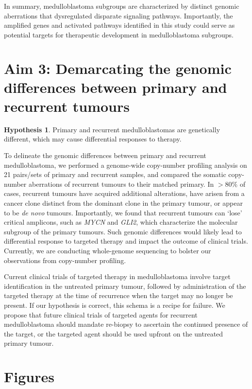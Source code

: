 \documentclass[11pt,letterpaper]{article}
\theoremstyle{definition}
\newtheorem*{hypothesis}{Hypothesis}
\begin{document}
In summary, medulloblastoma subgroups are characterized by distinct genomic aberrations that dysregulated disparate signaling pathways. Importantly, the amplified genes and activated pathways identified in this study could serve as potential targets for therapeutic development in medulloblastoma subgroups.

\section{Aim 3: Demarcating the genomic differences between primary and recurrent tumours}

\begin{hypothesis}
Primary and recurrent medulloblastomas are genetically different, which may cause differential responses to therapy.
\end{hypothesis}

To delineate the genomic differences between primary and recurrent medulloblastoma, we performed a genome-wide copy-number profiling analysis on 21 pairs/sets of primary and recurrent samples, and compared the somatic copy-number aberrations of recurrent tumours to their matched primary. In $>80\%$ of cases, recurrent tumours have acquired additional alterations, have arisen from a cancer clone distinct from the dominant clone in the primary tumour, or appear to be \emph{de novo} tumours. Importantly, we found that recurrent tumours can ‘lose’ critical amplicons, such as \emph{MYCN} and \emph{GLI2}, which characterize the molecular subgroup of the primary tumours. Such genomic differences would likely lead to differential response to targeted therapy and impact the outcome of clinical trials. Currently, we are conducting whole-genome sequencing to bolster our observations from copy-number profiling.

Current clinical trials of targeted therapy in medulloblastoma involve target identification in the untreated primary tumour, followed by administration of the targeted therapy at the time of recurrence when the target may no longer be present. If our hypothesis is correct, this schema is a recipe for failure.  We propose that future clinical trials of targeted agents for recurrent medulloblastoma should mandate re-biopsy to ascertain the continued presence of the target, or the targeted agent should be used upfront on the untreated primary tumour.

\clearpage

\section{Figures}
\end{document}
